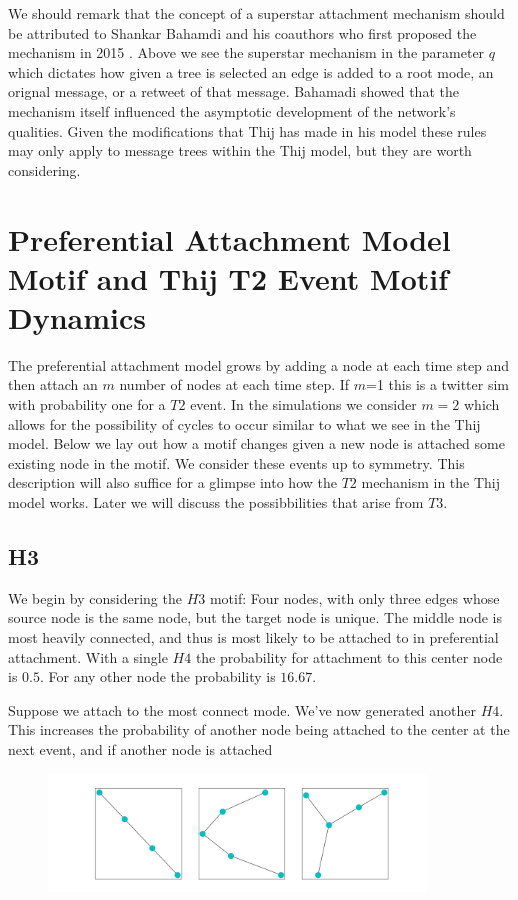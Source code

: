 \vspace{3mm}

We should remark that the concept of a superstar attachment mechanism should be attributed to Shankar 
Bahamdi and his coauthors who first proposed the mechanism in 2015 \cite{Bhamidi_2015}. Above
we see the superstar mechanism in the parameter $q$ which dictates how given a tree is selected an edge
is added to a root mode, an orignal message, or a retweet of that message. Bahamadi showed that the 
mechanism itself influenced the asymptotic development of the network's qualities. Given the modifications that
Thij has made in his model these rules may only apply to message trees within the Thij model, but they
are worth considering.

\chapter{Preferential Attachment Model Motif and Thij T2 Event Motif Dynamics}
The preferential attachment model grows by adding a node at each time step and then
attach an $m$ number of nodes at each time step. If $m$=1 this is a twitter sim
with probability one for a $T2$ event. In the simulations we consider $m=2$ which allows
for the possibility of cycles to occur similar to what we see in the Thij model. Below we 
lay out how a motif changes given a new node is attached some existing node in the motif. We 
consider these events up to symmetry. This description will also suffice for a glimpse into how the $T2$ mechanism in the Thij
model works. Later we will discuss the possibbilities that arise from $T3$.

\section{H3}
We begin by considering the $H3$ motif: Four nodes, with only three edges whose source node is the same
node, but the target node is unique. The middle node is most heavily connected, and thus is most likely
to be attached to in preferential attachment. With a single $H4$ the probability for attachment to this
center node is $0.5$. For any other node the probability is $16.67$. 


Suppose we attach to the most connect mode. We've now generated another $H4$. This increases the probability
of another node being attached to the center at the next event, and if another node is attached 

\begin{figure}[!ht]
    \includegraphics[width=10cm]{Images/H3_evolution.png}
    \centering
\end{figure}
\FloatBarrier



